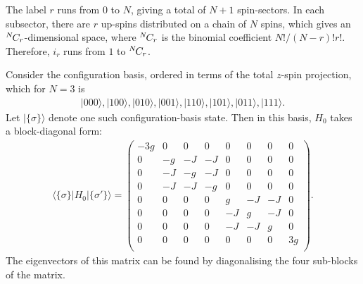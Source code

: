 \documentclass[a4paper]{memoir}
\newcommand{\bra}[1]{\langle#1|}
\newcommand{\ket}[1]{|#1\rangle}
\newcommand{\Choose}[2]{{}^{#1}\hspace{-1pt}C_{#2}}
\begin{document}
% 
The label $r$ runs from $0$ to $N$, giving a total of $N+1$
spin-sectors. In each subsector, there are $r$ up-spins distributed on
a chain of $N$ spins, which gives an $\Choose{N}{r}$-dimensional
space, where $\Choose{N}{r}$ is the binomial coefficient
$N!/(N-r)!r!$. Therefore, $i_r$ runs from $1$ to $\Choose{N}{r}$.
%
\par Consider the configuration basis, ordered in terms of the total
$z$-spin projection, which for $N=3$ is
\begin{align}
  \ket{000},\ket{100},\ket{010},\ket{001},\ket{110},\ket{101},\ket{011},\ket{111}.
\end{align}
Let $\ket{\{\sigma\}}$ denote one such configuration-basis state. Then
in this basis, $H_0$ takes a block-diagonal form:
\begin{align}
  \bra{\{\sigma\}}H_0\ket{\{\sigma'\}}=\left(
  \begin{array}{cccccccc}
    -3g & 0 & 0 & 0 & 0 & 0 & 0 & 0 \\
    0 & -g & -J & -J & 0 & 0 & 0 & 0 \\
    0 & -J & -g & -J & 0 & 0 & 0 & 0 \\
    0 & -J & -J & -g & 0 & 0 & 0 & 0 \\
    0 & 0 & 0 & 0 & g & -J & -J & 0 \\
    0 & 0 & 0 & 0 & -J & g & -J & 0 \\
    0 & 0 & 0 & 0 & -J & -J & g & 0 \\
    0 & 0 & 0 & 0 & 0 & 0 & 0 & 3g \\
  \end{array}
  \right).
\end{align}
The eigenvectors of this matrix can be found by diagonalising the four
sub-blocks of the matrix.
%
\end{document}
